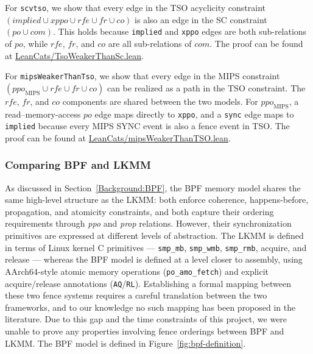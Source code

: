 For \texttt{scvtso}, we show that every edge in the TSO acyclicity constraint 
$(\mathit{implied} \cup \mathit{xppo} \cup \mathit{rfe} \cup \mathit{fr} \cup 
\mathit{co})$ is also an edge in the SC constraint $(\mathit{po} \cup \mathit{com})$. 
This holds because \texttt{implied} and \texttt{xppo} edges are both sub-relations 
of $\mathit{po}$, while $\mathit{rfe}$, $\mathit{fr}$, and $\mathit{co}$ are all 
sub-relations of $\mathit{com}$. The proof can be found at \href{https://github.com/nek0las/lean-cats/blob/main/LeanCats/TsoWeakerThanSc.lean}{LeanCats/TsoWeakerThanSc.lean}.

For \texttt{mipsWeakerThanTso}, we show that every edge in the MIPS constraint 
$(\mathit{ppo}_{\mathrm{MIPS}} \cup \mathit{rfe} \cup \mathit{fr} \cup \mathit{co})$ 
can be realized as a path in the TSO constraint. The $\mathit{rfe}$, $\mathit{fr}$, 
and $\mathit{co}$ components are shared between the two models. For 
$\mathit{ppo}_{\mathrm{MIPS}}$, a read--memory-access $\mathit{po}$ edge maps 
directly to \texttt{xppo}, and a \texttt{sync} edge maps to \texttt{implied} because 
every MIPS SYNC event is also a fence event in TSO. The proof can be found at \href{https://github.com/nek0las/lean-cats/blob/main/LeanCats/mipsWeakerThanTSO.lean}{LeanCats/mipsWeakerThanTSO.lean}.

\subsubsection{Comparing BPF and LKMM}
\label{sec:bpf}

As discussed in Section~\ref{Background:BPF}, the BPF memory model shares the same high-level structure as the LKMM: both enforce coherence, happens-before, propagation, and atomicity constraints, and both capture their ordering requirements through \textit{ppo} and \textit{prop} relations. However, their synchronization primitives are expressed at different levels of abstraction. The LKMM is defined in terms of Linux kernel C primitives --- \texttt{smp\_mb}, \texttt{smp\_wmb}, \texttt{smp\_rmb}, acquire, and release --- whereas the BPF model is defined at a level closer to assembly, using AArch64-style atomic memory operations (\texttt{po\_amo\_fetch}) and explicit acquire/release annotations (\texttt{AQ}/\texttt{RL}). Establishing a formal mapping between these two fence systems requires a careful translation between the two frameworks, and to our knowledge no such mapping has been proposed in the literature. Due to this gap and the time constraints of this project, we were unable to prove any properties involving fence orderings between BPF and LKMM. The BPF model is defined in Figure~\ref{fig:bpf-definition}.


